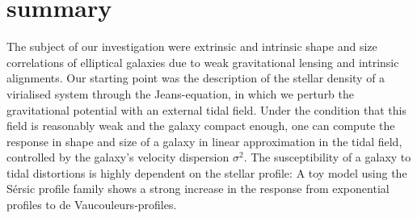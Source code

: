 \documentclass[a4paper,fleqn,usenatbib]{mnras}
\begin{document}
\section{summary}\label{sect_summary}
The subject of our investigation were extrinsic and intrinsic shape and size correlations of elliptical galaxies due to weak gravitational lensing and intrinsic alignments. Our starting point was the description of the stellar density of a virialised system through the Jeans-equation, in which we perturb the gravitational potential with an external tidal  field. Under the condition that this field is reasonably weak and the galaxy compact enough, one can compute the response in shape and size of a galaxy in linear approximation in the tidal field,  controlled by the galaxy's velocity dispersion $\sigma^2$. The susceptibility of a galaxy to tidal distortions is highly dependent on the stellar profile: A toy model using the S{\'e}rsic profile family shows a strong increase in the response from exponential profiles to de Vaucouleurs-profiles.
\end{document}
